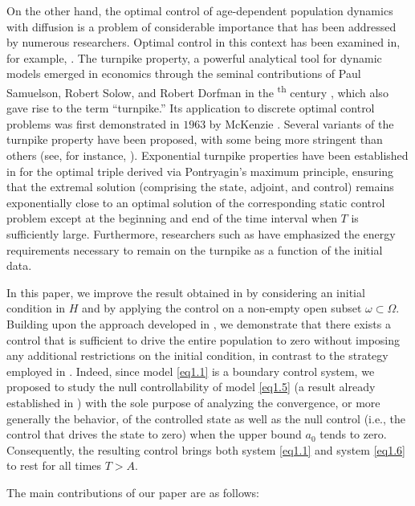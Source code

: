 \documentclass[10pt, a4]{amsart}
\theoremstyle{plain}
\theoremstyle{definition}
\theoremstyle{remark}
\numberwithin{equation}{section}
\begin{document}
On the other hand, the optimal control of age-dependent population dynamics with diffusion is a problem of considerable importance that has been addressed by numerous researchers. Optimal control in this context has been examined in, for example, \cite{ref42, ref49, ref57}. The turnpike property, a powerful analytical tool for dynamic models emerged in economics through the seminal contributions of Paul Samuelson, Robert Solow, and Robert Dorfman in the \textsc{}\textsuperscript{th} century \cite{ref11}, which also gave rise to the term “turnpike.” Its application to discrete optimal control problems was first demonstrated in $1963$ by McKenzie \cite{ref39}. Several variants of the turnpike property have been proposed, with some being more stringent than others (see, for instance, \cite{ref54, ref56}). Exponential turnpike properties have been established in \cite{ref53, ref54, ref55} for the optimal triple derived via Pontryagin’s maximum principle, ensuring that the extremal solution (comprising the state, adjoint, and control) remains exponentially close to an optimal solution of the corresponding static control problem except at the beginning and end of the time interval when \(T\) is sufficiently large. Furthermore, researchers such as \cite{ref5, ref32, ref33, ref36, ref38, ref44, ref52} have emphasized the energy requirements necessary to remain on the turnpike as a function of the initial data.

In this paper, we improve the result obtained in \cite{ref27} by considering an initial condition in $H$ and by applying the control on a non-empty open subset \(\omega \subset \Omega\). Building upon the approach developed in \cite{ref18}, we demonstrate that there exists a control that is sufficient to drive the entire population to zero without imposing any additional restrictions on the initial condition, in contrast to the strategy employed in \cite{ref27}. Indeed, since model \eqref{eq1.1} is a boundary control system, we proposed to study the null controllability of model \eqref{eq1.5} (a result already established in \cite{ref3}) with the sole purpose of analyzing the convergence, or more generally the behavior, of the controlled state as well as the null control (i.e., the control that drives the state to zero) when the upper bound \(a_0\) tends to zero. Consequently, the resulting control brings both system \eqref{eq1.1} and system \eqref{eq1.6} to rest for all times \(T > A\).

The main contributions of our paper are as follows:
\end{document}
